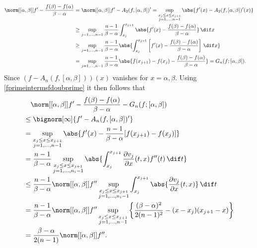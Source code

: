 \documentclass[]{elsarticle}
\theoremstyle{definition}
\theoremstyle{remark}
\newcommand{\GYnorm}[1]{\abs{#1}_{\cg_\cy}}
\begin{document}
\begin{align*}
\norm[{[\alpha, \beta]}]{f'-\frac{f(\beta)-f(\alpha)}{\beta-\alpha}} & = \norm[{[\alpha,\beta]}]{f'-A_2(f,[\alpha,\beta])'}
= \sup_{\substack{x_j \le x \le x_{j+1}\\ j=1, \ldots, n-1 }} \abs{f'(x) - A_{2}(f,[\alpha,\beta])'(x)} \\
&\ge \sup_{j=1, \ldots, n-1} \frac{n-1}{\beta-\alpha}\int_{x_j}^{x_{j+1}} \abs{f'(x) - \frac{f(\beta)-f(\alpha)}{\beta-\alpha}} \, \dif x \\
&\ge \sup_{j=1, \ldots, n-1} \frac{n-1}{\beta-\alpha} \abs{\int_{x_j}^{x_{j+1}} \left[f'(x) -\frac{f(\beta)-f(\alpha)}{\beta-\alpha}\right] \, \dif x }\\
&= \sup_{j=1, \ldots, n-1} \frac{n-1}{\beta-\alpha} \abs{f(x_{j+1})-f(x_j) - \frac{f(\beta)-f(\alpha)}{\beta-\alpha}} =G_n(f;[\alpha,\beta]).
\end{align*}
%
%
Since $(f-A_{n}(f,[\alpha,\beta]))(x)$ vanishes for $x=\alpha,\beta$. Using \eqref{fprimeintermsfdoubprime} it then follows that
\begin{align*}
& \ \ \ \norm[{[\alpha, \beta]}]{f'-\frac{f(\beta)-f(\alpha)}{\beta-\alpha}} -G_n(f;[\alpha,\beta]) \\
& \le \bignorm[\infty]{f' -A_{n}(f,[\alpha,\beta])'} \\
& = \sup_{\substack{x_j \le x \le x_{j+1}\\ j=1, \ldots, n-1 }} \abs{f'(x) -\frac{n-1}{\beta-\alpha}[f(x_{j+1})-f(x_j)]} \\
&=\frac{n-1}{\beta-\alpha} \sup_{\substack{x_j \le x \le x_{j+1}\\ j=1, \ldots, n_i-1 }} \abs{ \int_{x_j}^{x_{j+1}} \frac{\partial v_j}{\partial x}(t,x) f''(t) \, \dif t} \\
& \le \frac{n-1}{\beta-\alpha} \norm[{[\alpha, \beta]}]{f''} \sup_{\substack{x_j \le x \le x_{j+1}\\ j=1, \ldots, n_i-1 }} \int_{x_j}^{x_{j+1}} \abs{\frac{\partial v_j}{\partial x}(t,x)} \, \dif t \\
&=\frac{n-1}{\beta-\alpha}\norm[{[\alpha, \beta]}]{f''} \sup_{\substack{x_j \le x \le x_{j+1}\\ j=1, \ldots, n-1 }} \left \{\frac{(\beta-\alpha)^2}{2(n-1)^2} - (x-x_j)(x_{j+1}-x) \right\} \\
&= \frac{\beta-\alpha}{2(n-1)}\norm[{[\alpha, \beta]}]{f''}.
\end{align*}
\end{document}
